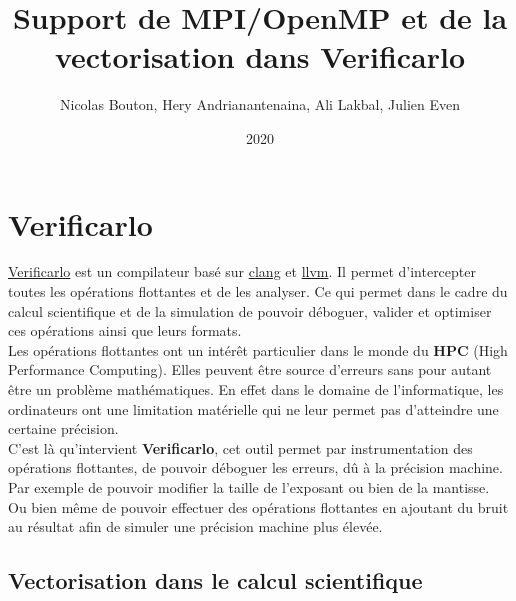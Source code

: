 \documentclass[11pt]{article}
\author{Nicolas Bouton, Hery Andrianantenaina, Ali Lakbal, Julien Even}
\date{2020}
\title{Support de MPI/OpenMP et de la vectorisation dans Verificarlo}
\begin{document}
\maketitle
\tableofcontents


\section{Verificarlo}
\label{sec:org15f48c8}

\href{https://github.com/verificarlo/verificarlo}{Verificarlo} est un compilateur basé sur \href{https://clang.llvm.org/}{clang} et \href{https://llvm.org/}{llvm}. Il
permet d'intercepter toutes les opérations flottantes et de les
analyser. Ce qui permet dans le cadre du calcul scientifique et de
la simulation de pouvoir déboguer, valider et optimiser ces
opérations ainsi que leurs formats.\\
\vspace{5mm}
Les opérations flottantes ont un intérêt particulier dans le monde
du \textbf{HPC} (High Performance Computing). Elles peuvent être source
d'erreurs sans pour autant être un problème mathématiques. En effet
dans le domaine de l'informatique, les ordinateurs ont une
limitation matérielle qui ne leur permet pas d'atteindre une
certaine précision.\\
\vspace{5mm}
C'est là qu'intervient \textbf{Verificarlo}, cet outil permet par
instrumentation des opérations flottantes, de pouvoir déboguer 
les erreurs, dû à la précision machine. Par exemple de pouvoir
modifier la taille de l'exposant ou bien de la mantisse. Ou
bien même de pouvoir effectuer des opérations flottantes en
ajoutant du bruit au résultat afin de simuler une précision machine
plus élevée.

\subsection{Vectorisation dans le calcul scientifique}
\label{sec:orge419564}
\end{document}
